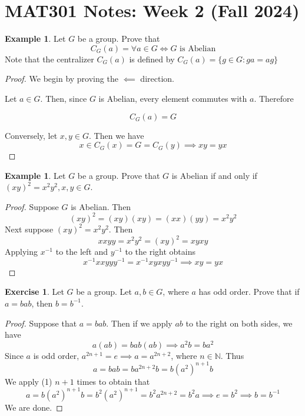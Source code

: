 \documentclass{article}
\theoremstyle{plain} %
\numberwithin{thm}{section} %
\theoremstyle{definition}
\newtheorem{example}[thm]{Example}
\newtheorem{exercise}[thm]{Exercise} %
\begin{document}
    \section{MAT301 Notes: Week 2 (Fall 2024)}
    \begin{example}
        Let \(G\) be a group. Prove that
        \[
            C_G (a) = \forall a \in G \iff G \text{ is Abelian}
        \]
        Note that the centralizer \(C_G(a)\) is defined by \(C_G(a) = \{ g \in G : ga=ag  \} \)
        \begin{proof}
            We begin by proving the \(\impliedby\) direction.

            Let \(a \in G\). Then, since \(G\) is Abelian, every element commutes with \(a\). Therefore

            \[
                C_G(a) = G
            \]  

            Conversely, let \(x,y \in G\). Then we have
            \[
                x \in C_G(x)=G=C_G(y) \implies xy=yx
            \]

        \end{proof}
    \end{example}
    \begin{example}
        Let \(G\) be a group. Prove that \(G\) is Abelian if and only if \((xy)^2=x^2y^2 , x,y \in G\).
        \begin{proof}
            Suppose \(G\) is Abelian. Then
            \[
                (xy)^2=(xy)(xy)=(xx)(yy)=x^2 y^2
            \] 
            Next suppose \((xy)^2 = x^2 y^2\). Then
            \[
                xxyy = x^2 y^2 = (xy)^2 = xyxy
            \]
            Applying \(x^{-1}\) to the left and \(y^{-1}\) to the right obtains
            \[
                x^{-1} xxyy y^{-1} = x^{-1} xyxy y^{-1} \implies xy=yx
            \]
        \end{proof} 
    \end{example}
    \begin{exercise}
        Let \(G\) be a group. Let \(a, b \in G\), where \(a\) has odd order. Prove that if \(a = bab\), then \(b = b^{-1} \). 
        \begin{proof}
            Suppose that \(a = bab\). Then if we apply \(ab\) to the right on both sides, we have
            \[
                a(ab) = bab(ab) \implies a^2 b = ba^2 \tag{1}
            \]
            Since \(a\) is odd order, \(a^{2n+1} = e \implies a = a^{2n+2} \), where \(n \in \mathbb{N} \). Thus
            \[
                a = bab = ba^{2n+2}b = b(a^2)^{n+1}b
            \] 
            We apply (1) \(n+1\) times to obtain that
            \[
                a = b(a^2)^{n+1}b = b^2 (a^2)^{n+1} = b^2 a^{2n+2} = b^2 a \implies e = b^2 \implies b = b^{-1} 
            \]
            We are done.
            
        \end{proof} 
    \end{exercise}
\end{document}
